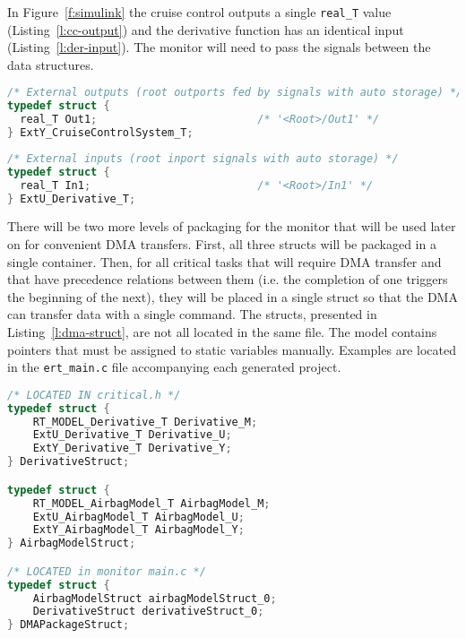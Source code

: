 In Figure~\ref{f:simulink} the cruise control outputs a single \texttt{real\_T} value (Listing~\ref{l:cc-output}) and the derivative function has an identical input (Listing~\ref{l:der-input}). The monitor will need to pass the signals between the data structures.
\begin{lstlisting}[caption={Cruise control output struct definition},label=l:cc-output,language=C]
/* External outputs (root outports fed by signals with auto storage) */
typedef struct {
  real_T Out1;                         /* '<Root>/Out1' */
} ExtY_CruiseControlSystem_T;
\end{lstlisting}

\begin{lstlisting}[caption={Derivative input struct definition},label=l:der-input,language=C]
/* External inputs (root inport signals with auto storage) */
typedef struct {
  real_T In1;                          /* '<Root>/In1' */
} ExtU_Derivative_T;
\end{lstlisting}

There will be two more levels of packaging for the monitor that will be used later on for convenient DMA transfers. First, all three structs will be packaged in a single container. Then, for all critical tasks that will require DMA transfer and that have precedence relations between them (i.e. the completion of one triggers the beginning of the next), they will be placed in a single struct so that the DMA can transfer data with a single command. The structs, presented in Listing~\ref{l:dma-struct}, are not all located in the same file. The model contains pointers that must be assigned to static variables manually. Examples are located in the \texttt{ert\_main.c} file accompanying each generated project.

\begin{lstlisting}[caption={Structures of structures to facilitate DMA transfer.},label=l:dma-struct,language=C]
/* LOCATED IN critical.h */
typedef struct {
	RT_MODEL_Derivative_T Derivative_M;
	ExtU_Derivative_T Derivative_U;
	ExtY_Derivative_T Derivative_Y;
} DerivativeStruct;

typedef struct {
	RT_MODEL_AirbagModel_T AirbagModel_M;
	ExtU_AirbagModel_T AirbagModel_U;
	ExtY_AirbagModel_T AirbagModel_Y;
} AirbagModelStruct;

/* LOCATED in monitor main.c */
typedef struct {
	AirbagModelStruct airbagModelStruct_0;
	DerivativeStruct derivativeStruct_0;
} DMAPackageStruct;
\end{lstlisting}